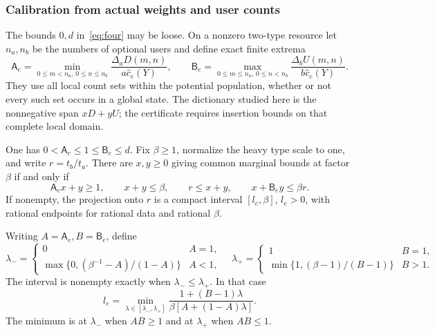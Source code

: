 \documentclass[manuscript,review,anonymous]{acmart}
\newcommand{\A}{\mathsf A}
\newcommand{\B}{\mathsf B}
\begin{document}
\subsubsection{Calibration from actual weights and user counts}\label{sec:intervals}
The bounds $0,d$ in~\eqref{eq:four} may be loose. On a nonzero two-type resource let $n_a,n_b$ be the numbers of optional users and define exact finite extrema
\begin{equation}\label{eq:ABextrema}
 \A_e=\min_{0\le m<n_a,\,0\le n\le n_b}
 \frac{\Delta_aD(m,n)}{a\widehat c_e(Y)},\qquad
 \B_e=\max_{0\le m\le n_a,\,0\le n<n_b}
 \frac{\Delta_bU(m,n)}{b\widehat c_e(Y)}.
\end{equation}
They use all local count sets within the potential population, whether or not every such set occurs in a global state. The dictionary studied here is the nonnegative span $xD+yU$; the certificate requires insertion bounds on that complete local domain.
\begin{theorem}\label{thm:interval}
One has $0<\A_e\le1\le\B_e\le d$. Fix $\beta\ge1$, normalize the heavy type scale to one, and write $r=t_b/t_a$. There are $x,y\ge0$ giving common marginal bounds at factor $\beta$ if and only if
\begin{equation}\label{eq:fourLP}
 \A_ex+y\ge1,\qquad x+y\le\beta,\qquad
 r\le x+y,\qquad x+\B_ey\le\beta r.
\end{equation}
If nonempty, the projection onto $r$ is a compact interval $[l_e,\beta]$, $l_e>0$, with rational endpoints for rational data and rational $\beta$.

Writing $A=\A_e,B=\B_e$, define
\[
 \lambda_-=
 \begin{cases}0&A=1,\\ \max\{0,(\beta^{-1}-A)/(1-A)\}&A<1,\end{cases}
 \quad
 \lambda_+=
 \begin{cases}1&B=1,\\ \min\{1,(\beta-1)/(B-1)\}&B>1.\end{cases}
\]
The interval is nonempty exactly when $\lambda_-\le\lambda_+$. In that case
\begin{equation}\label{eq:lowinterval}
 l_e=\min_{\lambda\in[\lambda_-,\lambda_+]}
 \frac{1+(B-1)\lambda}{\beta[A+(1-A)\lambda]}.
\end{equation}
The minimum is at $\lambda_-$ when $AB\ge1$ and at $\lambda_+$ when $AB\le1$.
\end{theorem}
\end{document}
